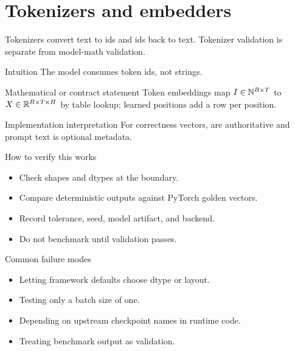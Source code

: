 \chapter{Tokenizers and embedders}
\label{ch:tokenizers-embedders}
Tokenizers convert text to ids and ids back to text. Tokenizer validation is separate from model-math validation.



\begin{intuitionbox}{Intuition}
The model consumes token ids, not strings.
\end{intuitionbox}

\begin{definitionbox}{Mathematical or contract statement}
Token embeddings map $I\in\mathbb{N}^{B\times T}$ to $X\in\mathbb{R}^{B\times T\times H}$ by table lookup; learned positions add a row per position.
\end{definitionbox}

\begin{implementationbox}{Implementation interpretation}
For correctness vectors,  are authoritative and prompt text is optional metadata.
\end{implementationbox}

\begin{verificationbox}{How to verify this works}
\begin{itemize}
\item Check shapes and dtypes at the boundary.
\item Compare deterministic outputs against PyTorch golden vectors.
\item Record tolerance, seed, model artifact, and backend.
\item Do not benchmark until validation passes.
\end{itemize}
\end{verificationbox}

\begin{warningbox}{Common failure modes}
\begin{itemize}
\item Letting framework defaults choose dtype or layout.
\item Testing only a batch size of one.
\item Depending on upstream checkpoint names in runtime code.
\item Treating benchmark output as validation.
\end{itemize}
\end{warningbox}

